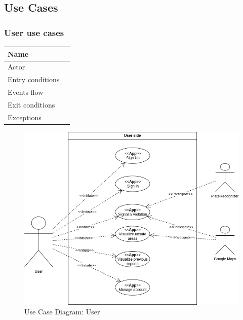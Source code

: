\documentclass{article}
\begin{document}
\subsection{Use Cases}
\subsubsection{User use cases}
\begin{table}[H]
    \begin{tabular}{|l|l|}
    \hline
    Name & \begin{minipage}[t]{0.7\textwidth}\textbf{} \end{minipage} \\ \hline  
    Actor & \begin{minipage}[t]{0.7\textwidth} \end{minipage} \\ \hline 
    Entry conditions & \begin{minipage}[t]{0.7\textwidth} \end{minipage} \\
    \hline 
    Events flow & \begin{minipage}[t]{0.7\textwidth} \end{minipage} \\ \hline
    Exit conditions & \begin{minipage}[t]{0.7\textwidth} \end{minipage} \\
    \hline
    Exceptions & \begin{minipage}[t]{0.7\textwidth} \end{minipage} \\ \hline
    \end{tabular}
\end{table}
\begin{figure}[H]
    \centering
    \includegraphics[scale=0.5]{Images/UseCaseUserView}
    \caption{Use Case Diagram: User}
\end{figure}
\end{document}
